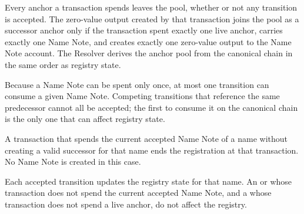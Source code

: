 Every anchor a transaction spends leaves the pool, whether or not any transition is accepted. The zero-value output created by that transaction joins the pool as a successor anchor only if the transaction spent exactly one live anchor, carries exactly one Name Note, and creates exactly one zero-value output to the Name Note account. The Resolver derives the anchor pool from the canonical chain in the same order as registry state.

Because a Name Note can be spent only once, at most one transition can consume a given Name Note. Competing transitions that reference the same predecessor cannot all be accepted; the first to consume it on the canonical chain is the only one that can affect registry state.

A transaction that spends the current accepted Name Note of a name without creating a valid successor for that name ends the registration at that transaction. No  Name Note is created in this case.

Each accepted transition updates the registry state for that name. An  or  whose transaction does not spend the current accepted Name Note, and a  whose transaction does not spend a live anchor, do not affect the registry.
